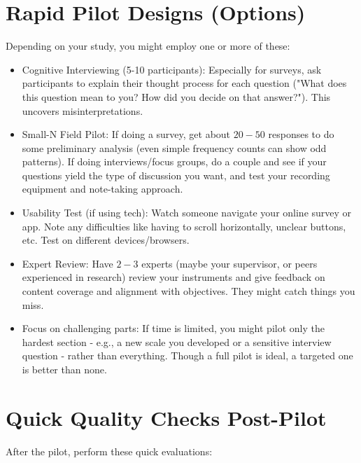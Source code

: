 \documentclass[10pt]{article}
\begin{document}
\section*{Rapid Pilot Designs (Options)}
Depending on your study, you might employ one or more of these:

\begin{itemize}
  \item Cognitive Interviewing (5-10 participants): Especially for surveys, ask participants to explain their thought process for each question ("What does\\
this question mean to you? How did you decide on that answer?"). This uncovers misinterpretations.
  \item Small-N Field Pilot: If doing a survey, get about $20-50$ responses to do some preliminary analysis (even simple frequency counts can show odd patterns). If doing interviews/focus groups, do a couple and see if your questions yield the type of discussion you want, and test your recording equipment and note-taking approach.
  \item Usability Test (if using tech): Watch someone navigate your online survey or app. Note any difficulties like having to scroll horizontally, unclear buttons, etc. Test on different devices/browsers.
  \item Expert Review: Have $2-3$ experts (maybe your supervisor, or peers experienced in research) review your instruments and give feedback on content coverage and alignment with objectives. They might catch things you miss.
  \item Focus on challenging parts: If time is limited, you might pilot only the hardest section - e.g., a new scale you developed or a sensitive interview question - rather than everything. Though a full pilot is ideal, a targeted one is better than none.
\end{itemize}

\section*{Quick Quality Checks Post-Pilot}
After the pilot, perform these quick evaluations:
\end{document}

